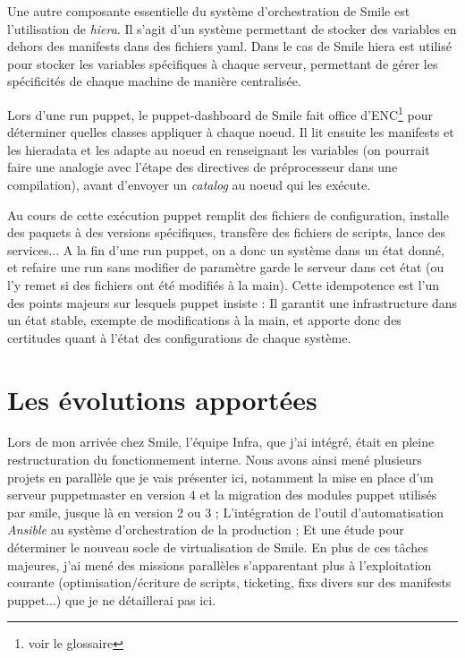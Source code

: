 \documentclass[14 pt,a4paper]{extreport}
\begin{document}
\newpage
Une autre composante essentielle du système d'orchestration de Smile est l'utilisation de \emph{hiera}. Il s'agit d'un système permettant de stocker des variables en dehors des manifests dans des fichiers yaml. Dans le cas de Smile hiera est utilisé pour stocker les variables spécifiques à chaque serveur, permettant de gérer les spécificités de chaque machine de manière centralisée.

Lors d'une run puppet, le puppet-dashboard de Smile fait office d'ENC\footnote{voir le glossaire} pour déterminer quelles classes appliquer à chaque noeud. Il lit ensuite les manifests et les hieradata et les adapte au noeud en renseignant les variables (on pourrait faire une analogie avec l'étape des directives de préprocesseur dans une compilation), avant d'envoyer un \emph{catalog} au noeud qui les exécute.

Au cours de cette exécution puppet remplit des fichiers de configuration, installe des paquets à des versions spécifiques, transfère des fichiers de scripts, lance des services... A la fin d'une run puppet, on a donc un système dans un état donné, et refaire une run sans modifier de paramètre garde le serveur dans cet état (ou l'y remet si des fichiers ont été modifiés à la main). Cette idempotence est l'un des points majeurs sur lesquels puppet insiste : Il garantit une infrastructure dans un état stable, exempte de modifications à la main, et apporte donc des certitudes quant à l'état des configurations de chaque système.

\chapter{Les évolutions apportées}

Lors de mon arrivée chez Smile, l'équipe Infra, que j'ai intégré, était en pleine restructuration du fonctionnement interne. Nous avons ainsi mené plusieurs projets en parallèle que je vais présenter ici, notamment la mise en place d'un serveur puppetmaster en version 4 et la migration des modules puppet utilisés par smile, jusque là en version 2 ou 3 ; L'intégration de l'outil d'automatisation \emph{Ansible} au système d'orchestration de la production ; Et une étude pour déterminer le nouveau socle de virtualisation de Smile. En plus de ces tâches majeures, j'ai mené des missions parallèles s'apparentant plus à l'exploitation courante (optimisation/écriture de scripts, ticketing, fixs divers sur des manifests puppet...) que je ne détaillerai pas ici.
\end{document}
